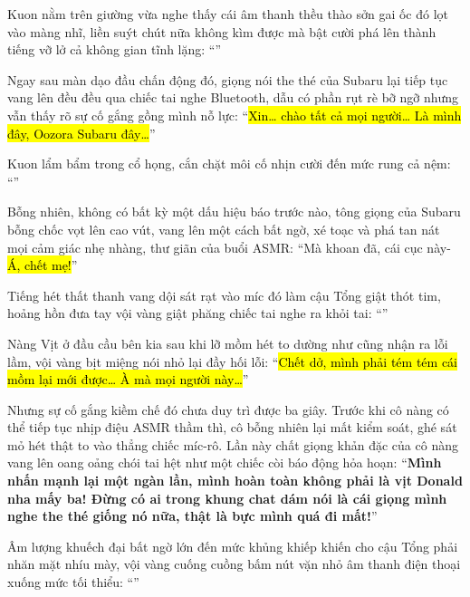 \documentclass[../main.tex]{subfiles}
\begin{document}
\il

Kuon nằm trên giường vừa nghe thấy cái âm thanh thều thào sởn gai ốc đó lọt vào màng nhĩ, liền suýt chút nữa không kìm được mà bật cười phá lên thành tiếng vỡ lở cả không gian tĩnh lặng: ``\textit{}''

Ngay sau màn dạo đầu chấn động đó, giọng nói the thé của Subaru lại tiếp tục vang lên đều đều qua chiếc tai nghe Bluetooth, dẫu có phần rụt rè bỡ ngỡ nhưng vẫn thấy rõ sự cố gắng gồng mình nỗ lực: ``\hl{Xin\dots{} chào tất cả mọi người\dots{} Là mình đây, Oozora Subaru đây\dots}''

Kuon lẩm bẩm trong cổ họng, cắn chặt môi cố nhịn cười đến mức rung cả nệm: ``\textit{}''

Bỗng nhiên, không có bất kỳ một dấu hiệu báo trước nào, tông giọng của Subaru bỗng chốc vọt lên cao vút, vang lên một cách bất ngờ, xé toạc và phá tan nát mọi cảm giác nhẹ nhàng, thư giãn của buổi ASMR: ``Mà khoan đã, cái cục này- \hl{Á, chết mẹ!}''

Tiếng hét thất thanh vang dội sát rạt vào míc đó làm cậu Tổng giật thót tim, hoảng hồn đưa tay vội vàng giật phăng chiếc tai nghe ra khỏi tai: ``''

Nàng Vịt ở đầu cầu bên kia sau khi lỡ mồm hét to dường như cũng nhận ra lỗi lầm, vội vàng bịt miệng nói nhỏ lại đầy hối lỗi: ``\hl{Chết dở, mình phải tém tém cái mồm lại mới được\dots{} À mà mọi người này\dots{}}''

Nhưng sự cố gắng kiềm chế đó chưa duy trì được ba giây. Trước khi cô nàng có thể tiếp tục nhịp điệu ASMR thầm thì, cô bỗng nhiên lại mất kiểm soát, ghé sát mỏ hét thật to vào thẳng chiếc míc-rô. Lần này chất giọng khản đặc của cô nàng vang lên oang oảng chói tai hệt như một chiếc còi báo động hỏa hoạn: ``\textbf{Mình nhấn mạnh lại một ngàn lần, mình hoàn toàn không phải là vịt Donald nha mấy ba! Đừng có ai trong khung chat dám nói là cái giọng mình nghe the thé giống nó nữa, thật là bực mình quá đi mất!}''


Âm lượng khuếch đại bất ngờ lớn đến mức khủng khiếp khiến cho cậu Tổng phải nhăn mặt nhíu mày, vội vàng cuống cuồng bấm nút vặn nhỏ âm thanh điện thoại xuống mức tối thiểu: ``''
\end{document}
